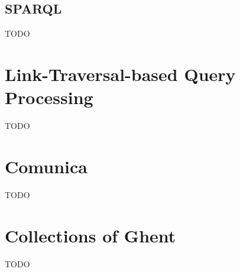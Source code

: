 \subsection{SPARQL}
\label{subsec:sparql}

TODO

\section{Link-Traversal-based Query Processing}
\label{sec:ltqp}

TODO

\section{Comunica}
\label{sec:comunica}

TODO

\section{Collections of Ghent}
\label{sec:coghent}

TODO

